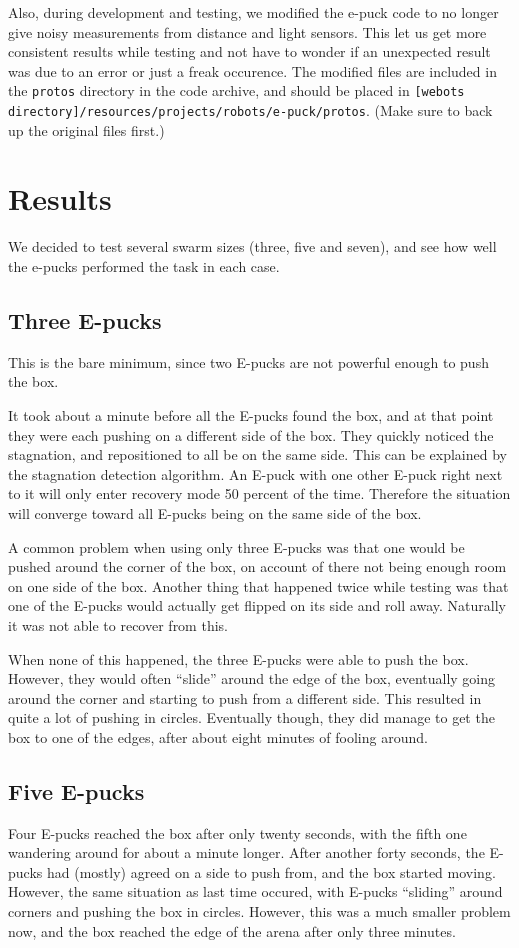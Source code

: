 \documentclass[a4paper,12pt]{article}
\begin{document}
Also, during development and testing, we modified the e-puck code to no longer give noisy measurements from distance and light sensors. This let us get more consistent results while testing and not have to wonder if an unexpected result was due to an error or just a freak occurence. The modified files are included in the \texttt{protos} directory in the code archive, and should be placed in \texttt{[webots directory]/resources/projects/robots/e-puck/protos}. (Make sure to back up the original files first.)

\section{Results}
We decided to test several swarm sizes (three, five and seven), and see how well the e-pucks performed the task in each case.
\subsection{Three E-pucks}
This is the bare minimum, since two E-pucks are not powerful enough to push the box.

It took about a minute before all the E-pucks found the box, and at that point they were each pushing on a different side of the box. They quickly noticed the stagnation, and repositioned to all be on the same side. This can be explained by the stagnation detection algorithm. An E-puck with one other E-puck right next to it will only enter recovery mode 50 percent of the time. Therefore the situation will converge toward all E-pucks being on the same side of the box.

A common problem when using only three E-pucks was that one would be pushed around the corner of the box, on account of there not being enough room on one side of the box. Another thing that happened twice while testing was that one of the E-pucks would actually get flipped on its side and roll away. Naturally it was not able to recover from this.

When none of this happened, the three E-pucks were able to push the box. However, they would often ``slide'' around the edge of the box, eventually going around the corner and starting to push from a different side. This resulted in quite a lot of pushing in circles. Eventually though, they did manage to get the box to one of the edges, after about eight minutes of fooling around.

\subsection{Five E-pucks}
Four E-pucks reached the box after only twenty seconds, with the fifth one wandering around for about a minute longer. After another forty seconds, the E-pucks had (mostly) agreed on a side to push from, and the box started moving. However, the same situation as last time occured, with E-pucks ``sliding'' around corners and pushing the box in circles. However, this was a much smaller problem now, and the box reached the edge of the arena after only three minutes. 
\end{document}
